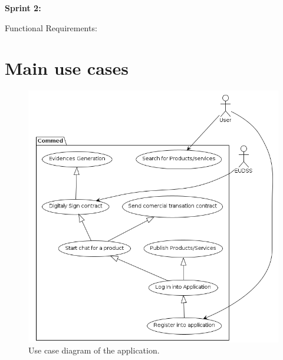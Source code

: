 \documentclass[./main.tex]{subfiles}
\begin{document}
\textbf{Sprint 2:}%

Functional Requirements:

\section{Main use cases}

\begin{figure}[h]
\centering
\includegraphics[width=\linewidth]{use_case_diagram/usecase_diagram.png} %
\caption{Use case diagram of the application.}
\end{figure}
\end{document}
